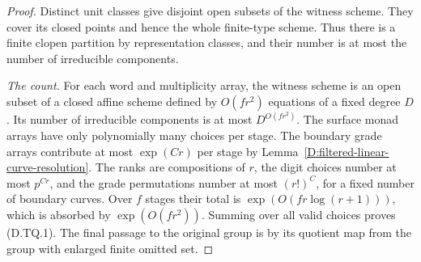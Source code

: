 \begin{proof}
Distinct unit classes give disjoint
open subsets of the witness scheme.
They cover its closed points and hence
the whole finite-type scheme.  Thus
there is a finite clopen partition
by representation classes, and their
number is at most the number of
irreducible components.

\emph{The count.}
For each word and multiplicity array,
the witness scheme is an open subset
of a closed affine scheme defined
by $O(fr^2)$ equations of a fixed
degree $D$.  Its number of irreducible
components is at most $D^{O(fr^2)}$.
The surface monad arrays have only
polynomially many choices per stage.
The boundary grade arrays contribute
at most $\exp(Cr)$ per stage by
Lemma~\ref{D:filtered-linear-curve-resolution}.
The ranks are compositions of $r$,
the digit choices number at most
$p^{Cr}$, and the grade permutations
number at most $(r!)^C$, for a fixed
number of boundary curves.
Over $f$ stages their total is
$\exp(O(fr\log(r+1)))$, which is
absorbed by $\exp(O(fr^2))$.
Summing over all valid choices proves
(D.TQ.1).  The final passage to the
original group is by its quotient
map from the group with enlarged
finite omitted set.
\end{proof}
